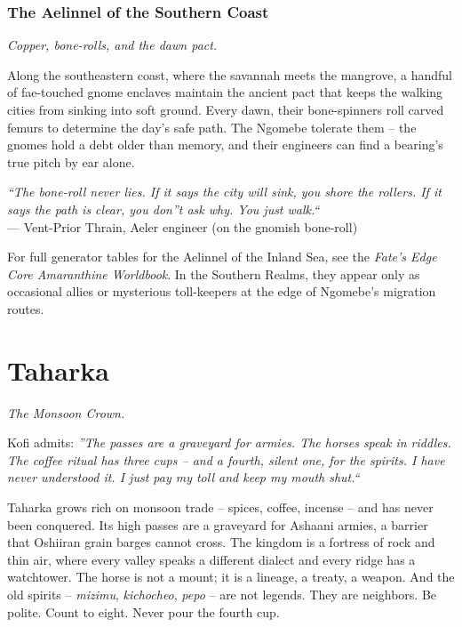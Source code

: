 \documentclass[12pt,oneside]{book}
\begin{document}
\subsection*{The Aelinnel of the Southern Coast}
\emph{Copper, bone-rolls, and the dawn pact.}

\noindent
Along the southeastern coast, where the savannah meets the mangrove, a handful of fae-touched gnome enclaves maintain the ancient pact that keeps the walking cities from sinking into soft ground. Every dawn, their bone-spinners roll carved femurs to determine the day's safe path. The Ngomebe tolerate them -- the gnomes hold a debt older than memory, and their engineers can find a bearing's true pitch by ear alone.

\vspace{0.5em}
\noindent\textit{``The bone-roll never lies. If it says the city will sink, you shore the rollers. If it says the path is clear, you don''t ask why. You just walk.``} \\
--- Vent-Prior Thrain, Aeler engineer (on the gnomish bone-roll)

\vspace{0.5em}
For full generator tables for the Aelinnel of the Inland Sea, see the \textit{Fate's Edge Core Amaranthine Worldbook}. In the Southern Realms, they appear only as occasional allies or mysterious toll-keepers at the edge of Ngomebe's migration routes.

\newpage

\newpage

\chapter{Taharka}
\emph{The Monsoon Crown.}

\noindent
Kofi admits: \textit{''The passes are a graveyard for armies. The horses speak in riddles. The coffee ritual has three cups -- and a fourth, silent one, for the spirits. I have never understood it. I just pay my toll and keep my mouth shut.``}

\noindent
Taharka grows rich on monsoon trade -- spices, coffee, incense -- and has never been conquered. Its high passes are a graveyard for Ashaani armies, a barrier that Oshiiran grain barges cannot cross. The kingdom is a fortress of rock and thin air, where every valley speaks a different dialect and every ridge has a watchtower. The horse is not a mount; it is a lineage, a treaty, a weapon. And the old spirits -- \textit{mizimu}, \textit{kichocheo}, \textit{pepo} -- are not legends. They are neighbors. Be polite. Count to eight. Never pour the fourth cup.
\end{document}
